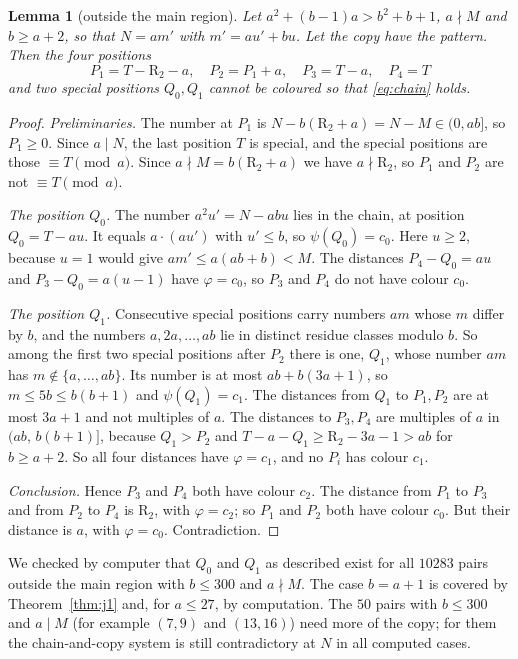 \documentclass[11pt,a4paper]{article}
\newtheorem{lemma}[theorem]{Lemma}
\theoremstyle{definition}
\theoremstyle{remark}
\newcommand{\R}{\mathrm{R}}
\begin{document}
\begin{lemma}[outside the main region]\label{lem:Wout}
Let $a^2+(b-1)a>b^2+b+1$, $a\nmid M$ and $b\ge a+2$, so that $N=am'$ with $m'=au'+bu$. Let the copy have the pattern. Then the four positions
\[
  P_1=T-\R_2-a,\quad P_2=P_1+a,\quad P_3=T-a,\quad P_4=T
\]
and two special positions $Q_0,Q_1$ cannot be coloured so that \eqref{eq:chain} holds.
\end{lemma}
\begin{proof}
\emph{Preliminaries.} The number at $P_1$ is $N-b(\R_2+a)=N-M\in(0,ab]$, so $P_1\ge0$. Since $a\mid N$, the last position $T$ is special, and the special positions are those $\equiv T\pmod a$. Since $a\nmid M=b(\R_2+a)$ we have $a\nmid\R_2$, so $P_1$ and $P_2$ are not $\equiv T\pmod a$.

\emph{The position $Q_0$.} The number $a^2u'=N-abu$ lies in the chain, at position $Q_0=T-au$. It equals $a\cdot(au')$ with $u'\le b$, so $\psi(Q_0)=c_0$. Here $u\ge2$, because $u=1$ would give $am'\le a(ab+b)<M$. The distances $P_4-Q_0=au$ and $P_3-Q_0=a(u-1)$ have $\varphi=c_0$, so $P_3$ and $P_4$ do not have colour $c_0$.

\emph{The position $Q_1$.} Consecutive special positions carry numbers $am$ whose $m$ differ by $b$, and the numbers $a,2a,\dots,ab$ lie in distinct residue classes modulo $b$. So among the first two special positions after $P_2$ there is one, $Q_1$, whose number $am$ has $m\notin\{a,\dots,ab\}$. Its number is at most $ab+b(3a+1)$, so $m\le5b\le b(b+1)$ and $\psi(Q_1)=c_1$. The distances from $Q_1$ to $P_1,P_2$ are at most $3a+1$ and not multiples of $a$. The distances to $P_3,P_4$ are multiples of $a$ in $(ab,\,b(b+1)]$, because $Q_1>P_2$ and $T-a-Q_1\ge\R_2-3a-1>ab$ for $b\ge a+2$. So all four distances have $\varphi=c_1$, and no $P_i$ has colour $c_1$.

\emph{Conclusion.} Hence $P_3$ and $P_4$ both have colour $c_2$. The distance from $P_1$ to $P_3$ and from $P_2$ to $P_4$ is $\R_2$, with $\varphi=c_2$; so $P_1$ and $P_2$ both have colour $c_0$. But their distance is $a$, with $\varphi=c_0$. Contradiction.
\end{proof}

We checked by computer that $Q_0$ and $Q_1$ as described exist for all $10283$ pairs outside the main region with $b\le300$ and $a\nmid M$. The case $b=a+1$ is covered by Theorem~\ref{thm:j1} and, for $a\le27$, by computation. The $50$ pairs with $b\le300$ and $a\mid M$ (for example $(7,9)$ and $(13,16)$) need more of the copy; for them the chain-and-copy system is still contradictory at $N$ in all computed cases.
\end{document}
